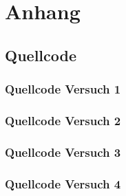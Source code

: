 \documentclass[12pt,oneside,a4paper]{report}
\begin{document}
%
%


%
%


%
%


%
%


%
%
\renewcommand\thesection{A.\arabic{section}}
\renewcommand\thesubsection{\thesection.\arabic{subsection}}

\chapter*{Anhang}
\label{chap:APPENDIX}
\addtocounter{chapter}{1}
\setcounter{section}{0}

\section{Quellcode}
\label{chap:APPENDIX_SOURCECODE}

\subsection{Quellcode Versuch 1}
\label{chap:APPENDIX_SOURCECODE_V1}

\subsection{Quellcode Versuch 2}
\label{chap:APPENDIX_SOURCECODE_V2}

\subsection{Quellcode Versuch 3}
\label{chap:APPENDIX_SOURCECODE_V3}

\newpage
\subsection{Quellcode Versuch 4}
\label{chap:APPENDIX_SOURCECODE_V4}



%
%

\end{document}
